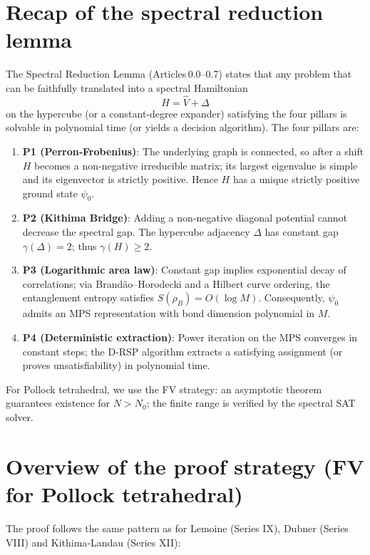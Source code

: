 \documentclass[11pt,a4paper]{article}
\begin{document}
\section{Recap of the spectral reduction lemma}

The Spectral Reduction Lemma (Articles 0.0–0.7) states that any problem that can be faithfully translated into a spectral Hamiltonian
\[
H = \hat{V} + \Delta
\]
on the hypercube (or a constant‑degree expander) satisfying the four pillars is solvable in polynomial time (or yields a decision algorithm). The four pillars are:

\begin{enumerate}
\item \textbf{P1 (Perron‑Frobenius)}: The underlying graph is connected, so after a shift \(H\) becomes a non‑negative irreducible matrix; its largest eigenvalue is simple and its eigenvector is strictly positive. Hence \(H\) has a unique strictly positive ground state \(\psi_0\).
\item \textbf{P2 (Kithima Bridge)}: Adding a non‑negative diagonal potential cannot decrease the spectral gap. The hypercube adjacency \(\Delta\) has constant gap \(\gamma(\Delta)=2\); thus \(\gamma(H) \ge 2\).
\item \textbf{P3 (Logarithmic area law)}: Constant gap implies exponential decay of correlations; via Brandão–Horodecki and a Hilbert curve ordering, the entanglement entropy satisfies \(S(\rho_B)=O(\log M)\). Consequently, \(\psi_0\) admits an MPS representation with bond dimension polynomial in \(M\).
\item \textbf{P4 (Deterministic extraction)}: Power iteration on the MPS converges in constant steps; the D‑RSP algorithm extracts a satisfying assignment (or proves unsatisfiability) in polynomial time.
\end{enumerate}

For Pollock tetrahedral, we use the FV strategy: an asymptotic theorem guarantees existence for \(N > N_0\); the finite range is verified by the spectral SAT solver.

\section{Overview of the proof strategy (FV for Pollock tetrahedral)}

The proof follows the same pattern as for Lemoine (Series IX), Dubner (Series VIII) and Kithima‑Landau (Series XII):
\end{document}
